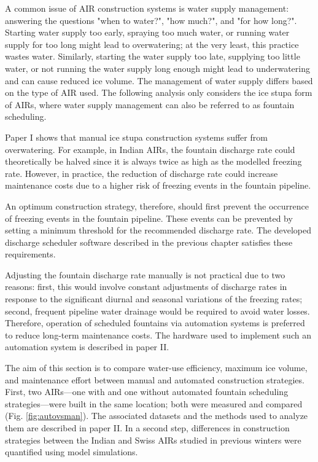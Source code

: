 A common issue of AIR construction systems is water supply management: answering the questions "when to
water?", "how much?", and "for how long?". Starting water supply too early, spraying too much water, or
running water supply for too long might lead to overwatering; at the very least, this practice wastes water.
Similarly, starting the water supply too late, supplying too little water, or not running the water supply long
enough might lead to underwatering and can cause reduced ice volume. The management of water supply
differs based on the type of AIR used. The following analysis only considers the ice stupa
form of AIRs, where water supply management can also be referred to as fountain scheduling.

Paper I shows that manual ice stupa construction systems suffer from overwatering. For example, in
Indian AIRs, the fountain discharge rate could theoretically be halved since it is always twice as high as the
modelled freezing rate. However, in practice, the reduction of discharge rate could increase maintenance costs
due to a higher risk of freezing events in the fountain pipeline.

An optimum construction strategy, therefore, should first prevent the occurrence of freezing events in the
fountain pipeline. These events can be prevented by setting a minimum threshold for the recommended discharge
rate. The developed discharge scheduler software described in the previous chapter satisfies these requirements.

Adjusting the fountain discharge rate manually is not practical due to two reasons: first, this would involve
constant adjustments of discharge rates in response to the significant diurnal and seasonal variations of the
freezing rates; second, frequent pipeline water drainage would be required to avoid water losses. Therefore, operation
of scheduled fountains via automation systems is preferred to reduce long-term maintenance costs. The
hardware used to implement such an automation system is described in paper II.

The aim of this section is to compare water-use efficiency, maximum ice volume, and maintenance effort between
manual and automated construction strategies. First, two AIRs---one with and one
without automated fountain scheduling strategies---were built in the same location; both were measured and compared (Fig. \ref{fig:autovsman}).
The associated datasets and the methods used to analyze them are described in paper II. In a second step,
differences in construction strategies between the Indian and Swiss AIRs studied in previous winters were quantified
using model simulations. 

